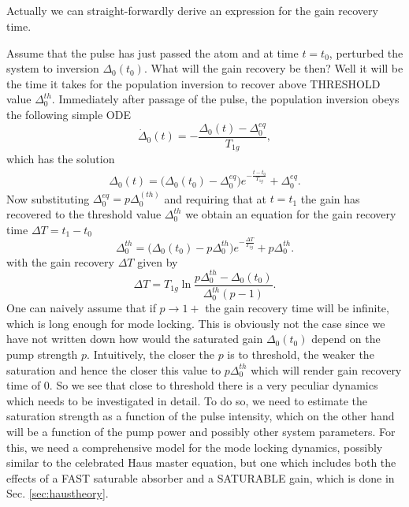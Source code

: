 \documentclass[preprint,secnumarabic,amssymb, nobibnotes, aip, prd]{revtex4-1}
\begin{document}
\subsection{}
Actually we can straight-forwardly derive an expression for the gain recovery time. 

Assume that the pulse has just passed the atom and at time $t=t_0$, perturbed the system to inversion $\Delta_0(t_0)$. What will the gain recovery be then? Well it will be the time it takes for the population inversion to recover above THRESHOLD value $\Delta_{0}^{th}$. Immediately after passage of the pulse, the population inversion obeys the following simple ODE
\begin{equation}
\dot\Delta_0(t) = -\frac{\Delta_0(t) -\Delta_0^{eq}}{T_{1g}},
\end{equation}    
which has the solution 
\begin{eqnarray}
\Delta_0(t) = \big(\Delta_0(t_0) -\Delta_0^{eq}\big)e^{-\frac{t-t_0}{T_{1g}}}+\Delta_0^{eq}.
\end{eqnarray}
Now substituting $\Delta_0^{eq} = p\Delta_0^{(th)}$ and requiring that at $t=t_1$ the gain has recovered to the threshold value $\Delta_0^{th}$ we obtain an equation for the gain recovery time $\Delta T = t_1-t_0$ 
\begin{equation}
\Delta_{0}^{th} = \big(\Delta_0(t_0) - p\Delta_0^{th}\big)e^{-\frac{\Delta T}{T_{1g}}}+p\Delta_0^{th}.
\end{equation}
with the gain recovery $\Delta T $ given by
\begin{equation}
\Delta T = T_{1g} \ln\frac{p\Delta_0^{th}-\Delta_0(t_0)}{\Delta_0^{th}(p-1)}.
\end{equation}
One can naively assume that if $p\to1+$ the gain recovery time will be infinite, which is long enough for mode locking. This is obviously not the case since we have not written down how would the saturated gain $\Delta_0(t_0)$ depend on the pump strength $p$. Intuitively, the closer the $p$ is to threshold, the weaker the saturation and hence the closer this value to $p\Delta_0^{th}$ which will render gain recovery time of 0. So we see that close to threshold there is a very peculiar dynamics which needs to be investigated in detail. To do so, we need to estimate the saturation strength as a function of the pulse intensity, which on the other hand will be a function of the pump power and possibly other system parameters. For this, we need a comprehensive model for the mode locking dynamics, possibly similar to the celebrated Haus master equation, but one which includes both the effects of a FAST saturable absorber and a SATURABLE gain, which is done in Sec. \ref{sec:haustheory}. 
\end{document}
